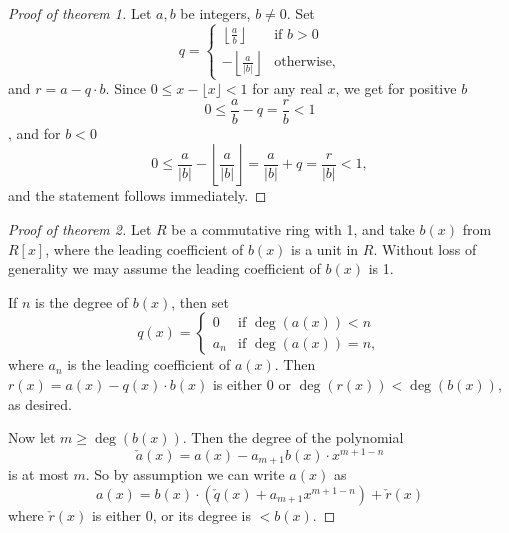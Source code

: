 \documentclass[12pt]{article}
\begin{document}
\begin{proof}[Proof of theorem 1]
Let $a,b$ be integers, $b \ne 0$. Set
\[q=\begin{cases}
\left\lfloor \frac{a}{b}\right\rfloor &\text{if $b>0$} \\
-\left\lfloor \frac{a}{\lvert b\rvert}\right\rfloor &\text{otherwise},
\end{cases}
\]
and $r=a-q\cdot b$. Since $0\le x -\lfloor x\rfloor < 1$ for any real $x$, we get for positive $b$
\[0\le \frac{a}{b} -q =\frac{r}{b} < 1\],
and for $b<0$
\[0 \le \frac{a}{\lvert b \rvert} -\left\lfloor\frac{a}{\lvert b\rvert}\right\rfloor =\frac{a}{\lvert b\rvert} +q=\frac{r}{\lvert b\rvert} <1,\]
and the statement follows immediately.
\end{proof}

\begin{proof}[Proof of theorem 2]
Let $R$ be a commutative ring with 1, and take $b(x)$ from $R[x]$, where the leading coefficient of $b(x)$ is a unit in $R$. Without loss of generality we may assume the leading coefficient of $b(x)$ is 1.

If $n$ is the degree of $b(x)$, then set
\[q(x)=
\begin{cases}
0&\text{if $\deg(a(x)) <n$}\\
a_n&\text{if $\deg(a(x))=n$},
\end{cases}\]
where $a_n$ is the leading coefficient of $a(x)$. Then $r(x)=a(x) -q(x)\cdot b(x)$ is either 0 or $\deg(r(x))<\deg(b(x))$, as desired.

Now let $m \ge \deg(b(x))$. Then the degree of the polynomial
\[\check{a}(x)=a(x) -a_{m+1}b(x)\cdot x^{m+1-n}\]
is at most $m$. So by assumption we can write $a(x)$ as
\[a(x)=b(x)\cdot(\check{q}(x)+a_{m+1}x^{m+1-n}) +\check{r}(x)\]
where $\check{r}(x)$ is either 0, or its degree is $<b(x)$.
\end{proof}
\end{document}
